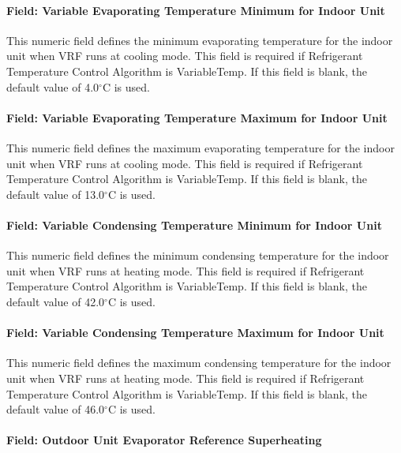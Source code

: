 \paragraph{Field: Variable Evaporating Temperature Minimum for Indoor Unit}

This numeric field defines the minimum evaporating temperature for the indoor unit when VRF runs at cooling mode. This field is required if Refrigerant Temperature Control Algorithm is VariableTemp. If this field is blank, the default value of 4.0$^\circ$C is used.

\paragraph{Field: Variable Evaporating Temperature Maximum for Indoor Unit}

This numeric field defines the maximum evaporating temperature for the indoor unit when VRF runs at cooling mode. This field is required if Refrigerant Temperature Control Algorithm is VariableTemp. If this field is blank, the default value of 13.0$^\circ$C is used.

\paragraph{Field: Variable Condensing Temperature Minimum for Indoor Unit}

This numeric field defines the minimum condensing temperature for the indoor unit when VRF runs at heating mode. This field is required if Refrigerant Temperature Control Algorithm is VariableTemp. If this field is blank, the default value of 42.0$^\circ$C is used.

\paragraph{Field: Variable Condensing Temperature Maximum for Indoor Unit}

This numeric field defines the maximum condensing temperature for the indoor unit when VRF runs at heating mode. This field is required if Refrigerant Temperature Control Algorithm is VariableTemp. If this field is blank, the default value of 46.0$^\circ$C is used.

\paragraph{Field: Outdoor Unit Evaporator Reference Superheating}

